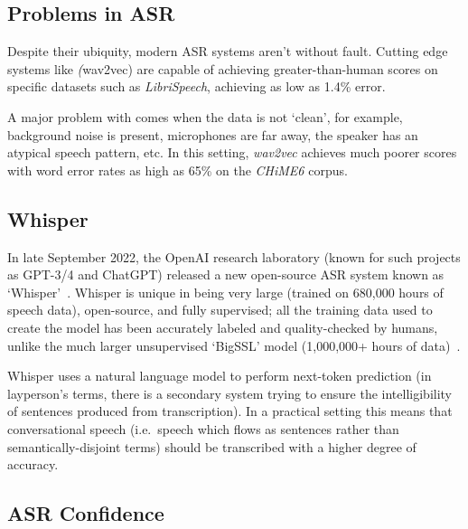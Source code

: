 \subsection{Problems in ASR}

Despite their ubiquity, modern ASR systems aren't without fault.
Cutting edge systems like \emph(wav2vec) are capable of achieving greater-than-human scores on specific datasets\cite{wav2vec2,bigssl,chung2021} such as \emph{LibriSpeech}\cite{librispeech}, achieving as low as 1.4\% error\cite{zhang2020}.

A major problem with comes when the data is not `clean', for example, background noise is present, microphones are far away, the speaker has an atypical speech pattern, etc. 
In this setting, \emph{wav2vec} achieves much poorer scores with word error rates as high as 65\%\cite{whisper} on the \emph{CHiME6} corpus\cite{chime6}.


\subsection{Whisper}

In late September 2022, the OpenAI research laboratory (known for such projects as GPT-3/4 and ChatGPT) released a new open-source ASR system known as `Whisper'~\cite{whisper}.
Whisper is unique in being very large (trained on 680,000 hours of speech data), open-source, and fully supervised;
all the training data used to create the model has been accurately labeled and
quality-checked by humans, unlike the much larger unsupervised `BigSSL' model (1,000,000+ hours of data)~\cite{bigssl}.

Whisper uses a natural language model to perform next-token prediction (in layperson's terms, there is a secondary system trying to ensure the intelligibility of sentences produced from transcription).
In a practical setting this means that conversational speech (i.e.\ speech which flows as sentences rather than semantically-disjoint terms) should be transcribed with a higher degree of accuracy.

\subsection{ASR Confidence}

